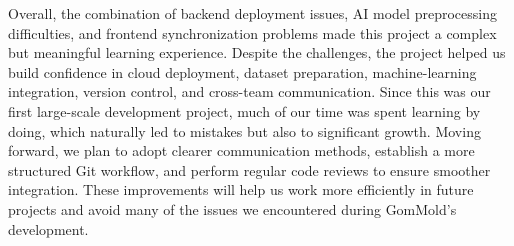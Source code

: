 \documentclass[conference]{IEEEtran}
\begin{document}
Overall, the combination of backend deployment issues, AI model preprocessing difficulties, and frontend synchronization problems made this project a complex but meaningful learning experience. Despite the challenges, the project helped us build confidence in cloud deployment, dataset preparation, machine-learning integration, version control, and cross-team communication. Since this was our first large-scale development project, much of our time was spent learning by doing, which naturally led to mistakes but also to significant growth. Moving forward, we plan to adopt clearer communication methods, establish a more structured Git workflow, and perform regular code reviews to ensure smoother integration. These improvements will help us work more efficiently in future projects and avoid many of the issues we encountered during GomMold’s development.
\end{document}
